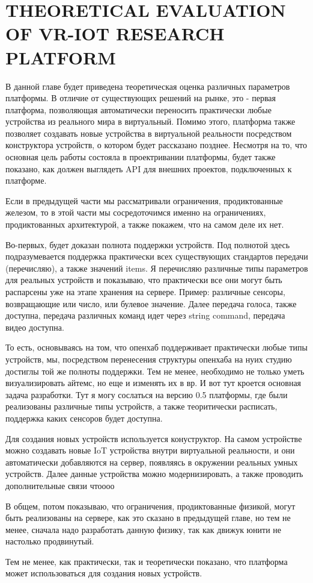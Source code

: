 
\chapter{THEORETICAL EVALUATION OF VR-IOT RESEARCH PLATFORM}
В данной главе будет приведена теоретическая оценка различных параметров платформы. В отличие от существующих решений на рынке, это - первая платформа, позволяющая автоматически переносить практически любые устройства из реального мира в виртуальный. Помимо этого, платформа также позволяет создавать новые устройства в виртуальной реальности посредством конструктора устройств, о котором будет рассказано позднее. Несмотря на то, что основная цель работы состояла в проектривании платформы, будет также показано, как должен выглядеть API для внешних проектов, подключенных к платформе.

Если в предыдущей части мы рассматривали ограничения, продиктованные железом, то в этой части мы сосредоточимся именно на ограничениях, продиктованных архитектурой, а также покажем, что на самом деле их нет.

Во-первых, будет доказан полнота поддержки устройств. Под полнотой здесь подразумевается поддержка практически всех существующих стандартов передачи (перечисляю), а также значений items. Я перечисляю различные типы параметров для реальных устройств и показываю, что практически все они могут быть распарсены уже на этапе хранения на сервере. Пример: различные сенсоры, возвращающие или число, или булевое значение. Далее передача голоса, также доступна, передача различных команд идет через string command, передача видео доступна.

То есть, основываясь на том, что опенхаб поддерживает практически любые типы устройств, мы, посредством перенесения структуры опенхаба на нуих студию достиглы той же полноты поддержки. Тем не менее, необходимо не только уметь визуализировать айтемс, но еще и изменять их в вр. И вот тут кроется основная задача разработки. Тут я могу сослаться на версию 0.5 платформы, где были реализованы различные типы устройств, а также теоритически расписать, поддержка каких сенсоров будет доступна.

Для создания новых устройств используется конуструктор. На самом устройстве можно создавать новые IoT устройства внутри виртуальной реальности, и они автоматически добавляются на сервер, появляясь в окружении реальных умных устройств. Далее данные устройства можно модернизировать, а также проводить дополнительные связи чтоооо

В общем, потом показываю, что ограничения, продиктованные физикой, могут быть реализованы на сервере, как это сказано в предыдущей главе, но тем не менее, сначала надо разработать данную физику, так как движук юнити не настолько продвинутый.

Тем не менее, как практически, так и теоретически показано, что платформа может использоваться для создания новых устройств.